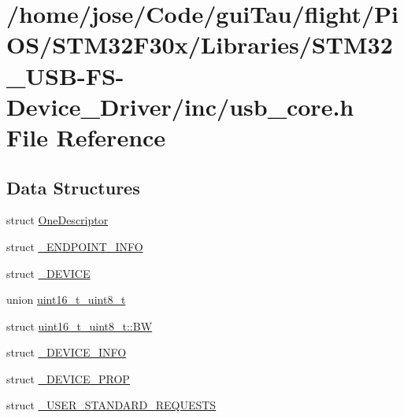 \hypertarget{_s_t_m32_f30x_2_libraries_2_s_t_m32___u_s_b-_f_s-_device___driver_2inc_2usb__core_8h}{\section{/home/jose/\-Code/gui\-Tau/flight/\-Pi\-O\-S/\-S\-T\-M32\-F30x/\-Libraries/\-S\-T\-M32\-\_\-\-U\-S\-B-\/\-F\-S-\/\-Device\-\_\-\-Driver/inc/usb\-\_\-core.h File Reference}
\label{_s_t_m32_f30x_2_libraries_2_s_t_m32___u_s_b-_f_s-_device___driver_2inc_2usb__core_8h}
}
\subsection*{Data Structures}
\begin{DoxyCompactItemize}
\item 
struct \hyperlink{struct_one_descriptor}{One\-Descriptor}
\item 
struct \hyperlink{struct___e_n_d_p_o_i_n_t___i_n_f_o}{\-\_\-\-E\-N\-D\-P\-O\-I\-N\-T\-\_\-\-I\-N\-F\-O}
\item 
struct \hyperlink{struct___d_e_v_i_c_e}{\-\_\-\-D\-E\-V\-I\-C\-E}
\item 
union \hyperlink{unionuint16__t__uint8__t}{uint16\-\_\-t\-\_\-uint8\-\_\-t}
\item 
struct \hyperlink{structuint16__t__uint8__t_1_1_b_w}{uint16\-\_\-t\-\_\-uint8\-\_\-t\-::\-B\-W}
\item 
struct \hyperlink{struct___d_e_v_i_c_e___i_n_f_o}{\-\_\-\-D\-E\-V\-I\-C\-E\-\_\-\-I\-N\-F\-O}
\item 
struct \hyperlink{struct___d_e_v_i_c_e___p_r_o_p}{\-\_\-\-D\-E\-V\-I\-C\-E\-\_\-\-P\-R\-O\-P}
\item 
struct \hyperlink{struct___u_s_e_r___s_t_a_n_d_a_r_d___r_e_q_u_e_s_t_s}{\-\_\-\-U\-S\-E\-R\-\_\-\-S\-T\-A\-N\-D\-A\-R\-D\-\_\-\-R\-E\-Q\-U\-E\-S\-T\-S}
\end{DoxyCompactItemize}
